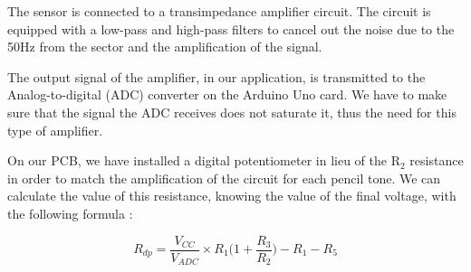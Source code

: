 \documentclass[10pt]{datasheet}
\begin{document}
The sensor is connected to a transimpedance amplifier circuit. The circuit is equipped with a 
low-pass and high-pass filters to cancel out the noise due to the 50Hz from the sector and the amplification 
of the signal. 

The output signal of the amplifier, in our application, is transmitted to the Analog-to-digital (ADC) converter on the Arduino Uno
card. We have to make sure that the signal the ADC receives does not saturate it, thus the need for this type of amplifier. 

On our PCB, we have installed a digital potentiometer in lieu of the $\text{R}_2$ resistance in order to match the amplification of the circuit
for each pencil tone. We can calculate the value of this resistance, knowing the value of the final voltage, with the following formula :

\begin{equation*}
    R_{dp} = \frac{V_{CC}}{V_{ADC}}\times R_1\Big(1 + \frac{R_3}{R_2}\Big) - R_1 - R_5
\end{equation*}
\end{document}

